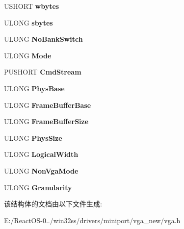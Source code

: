 \begin{DoxyCompactItemize}
U\+S\+H\+O\+RT {\bfseries wbytes}
\item 
\mbox{\label{struct_v_i_d_e_o_m_o_d_e_afe0816969faefaa6086b1a4acf10a670}} 
U\+L\+O\+NG {\bfseries sbytes}
\item 
\mbox{\label{struct_v_i_d_e_o_m_o_d_e_a20d1acb07c4d2a00ea59eba43082fa5c}} 
U\+L\+O\+NG {\bfseries No\+Bank\+Switch}
\item 
\mbox{\label{struct_v_i_d_e_o_m_o_d_e_a19d6a694632cdb9f14755358555dd82c}} 
U\+L\+O\+NG {\bfseries Mode}
\item 
\mbox{\label{struct_v_i_d_e_o_m_o_d_e_a0df85f1697a9683c96efa60b4d4cb9fe}} 
P\+U\+S\+H\+O\+RT {\bfseries Cmd\+Stream}
\item 
\mbox{\label{struct_v_i_d_e_o_m_o_d_e_abc09fe4461687b144a80abcc0b37a59c}} 
U\+L\+O\+NG {\bfseries Phys\+Base}
\item 
\mbox{\label{struct_v_i_d_e_o_m_o_d_e_ae890b0f31f1ca105ed67255f35868888}} 
U\+L\+O\+NG {\bfseries Frame\+Buffer\+Base}
\item 
\mbox{\label{struct_v_i_d_e_o_m_o_d_e_a31d00bd5e21ceddf33f85ffbabd405d9}} 
U\+L\+O\+NG {\bfseries Frame\+Buffer\+Size}
\item 
\mbox{\label{struct_v_i_d_e_o_m_o_d_e_aca55b891f4059a6e3fb65249be2b551d}} 
U\+L\+O\+NG {\bfseries Phys\+Size}
\item 
\mbox{\label{struct_v_i_d_e_o_m_o_d_e_a063e4e5db364af993cae247385a9f6d8}} 
U\+L\+O\+NG {\bfseries Logical\+Width}
\item 
\mbox{\label{struct_v_i_d_e_o_m_o_d_e_ac85f5ab8eb2135a8cfd6afa30595797e}} 
U\+L\+O\+NG {\bfseries Non\+Vga\+Mode}
\item 
\mbox{\label{struct_v_i_d_e_o_m_o_d_e_a0e6753315980ace0ca11e77d584e880c}} 
U\+L\+O\+NG {\bfseries Granularity}
\end{DoxyCompactItemize}


该结构体的文档由以下文件生成\+:\begin{DoxyCompactItemize}
\item 
E\+:/\+React\+O\+S-\/0../win32ss/drivers/miniport/vga\+\_\+new/vga.\+h\end{DoxyCompactItemize}
